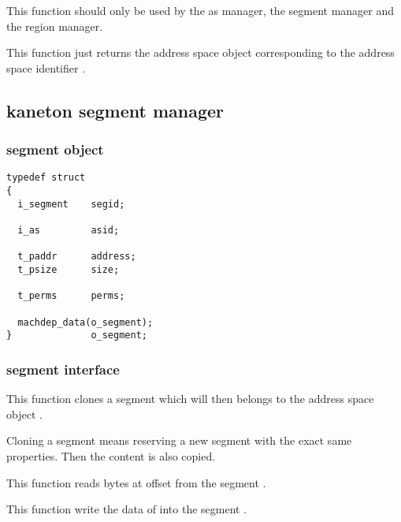 	 {
	   This function should only be used by the as manager, the segment
	   manager and the region manager.

	   This function just returns the address space object
	   corresponding to the address space identifier .
	 }

\subsection{kaneton segment manager}

\subsubsection{segment object}

\begin{verbatim}
typedef struct
{
  i_segment    segid;

  i_as         asid;

  t_paddr      address;
  t_psize      size;

  t_perms      perms;

  machdep_data(o_segment);
}              o_segment;
\end{verbatim}

\subsubsection{segment interface}

	 {
	   This function clones a segment which will then belongs to
	   the address space object .

	   Cloning a segment means reserving a new segment with the
	   exact same properties. Then the content is also copied.
	 }

	 {
	   This function reads  bytes at offset
	    from the segment .
	 }

	 {
	   This function write the data of  into the
	   segment .
	 }

